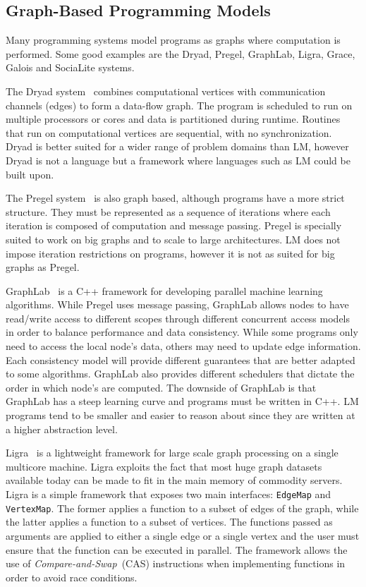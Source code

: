 \subsection{Graph-Based Programming Models}

Many programming systems model programs as graphs where computation is
performed. Some good examples are the Dryad, Pregel, GraphLab, Ligra, Grace,
Galois and SociaLite systems.

The Dryad system~\cite{Isard:2007:DDD:1272996.1273005} combines computational
vertices with communication channels (edges) to form a data-flow graph. The
program is scheduled to run on multiple processors or cores and data is
partitioned during runtime. Routines that run on computational vertices are
sequential, with no synchronization. Dryad is better suited for a wider range of
problem domains than LM, however Dryad is not a language but a framework where
languages such as LM could be built upon.

The Pregel system~\cite{Malewicz:2010:PSL:1807167.1807184} is also graph based,
although programs have a more strict structure. They must be represented as
a sequence of iterations where each iteration is composed of computation and
message passing. Pregel is specially suited to work on big graphs and to
scale to large architectures. LM does not impose iteration restrictions on
programs, however it is not as suited for big graphs as Pregel.

GraphLab~\cite{GraphLab2010} is a C++ framework for developing parallel machine
learning algorithms. While Pregel uses message passing, GraphLab allows nodes to
have read/write access to different scopes through different concurrent access
models in order to balance performance and data consistency. While some programs
only need to access the local node's data, others may need to update edge
information. Each consistency model will provide different guarantees that are
better adapted to some algorithms. GraphLab also provides different schedulers
that dictate the order in which node's are computed. The downside of GraphLab is
that GraphLab has a steep learning curve and programs must be written in
C++. LM programs tend to be smaller and easier to reason about since they are
written at a higher abstraction level.

Ligra~\cite{Shun:2013:LLG:2517327.2442530} is a lightweight framework for large
scale graph processing on a single multicore machine. Ligra exploits the fact
that most huge graph datasets available today can be made to fit in the main
memory of commodity servers. Ligra is a simple framework that exposes two main
interfaces: \texttt{EdgeMap} and \texttt{VertexMap}. The former applies a
function to a subset of edges of the graph, while the latter applies a function
to a subset of vertices. The functions passed as arguments are applied to either
a single edge or a single vertex and the user must ensure that the function can
be executed in parallel. The framework allows the use of
\emph{Compare-and-Swap}~(CAS) instructions when implementing functions in order
to avoid race conditions.


